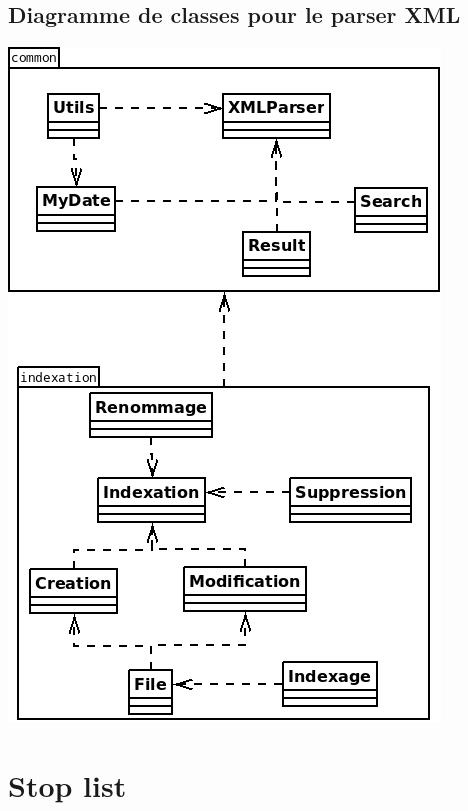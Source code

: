 \subsection{Diagramme de classes pour le parser XML}
\begin{center}
\includegraphics[scale=0.6]{"images/diagramme_classes_xmlparser"}
\end{center}


\section{Stop list}\label{stop_list}

\newpage

